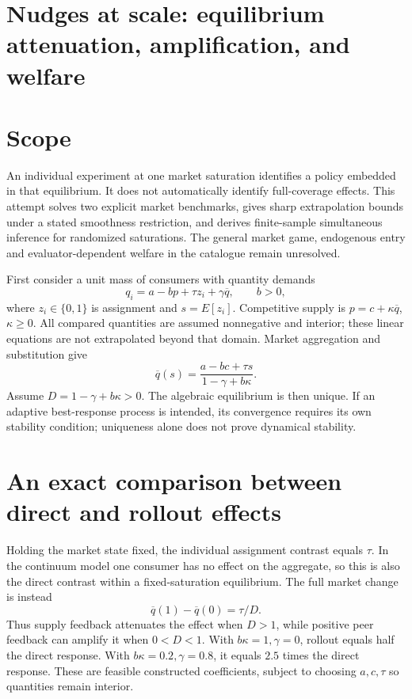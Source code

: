 \documentclass[11pt,a4paper]{article}
\begin{document}
\section*{Nudges at scale: equilibrium attenuation, amplification, and welfare}
\section{Scope}
An individual experiment at one market saturation identifies a policy embedded in that equilibrium. It does not automatically identify full-coverage effects. This attempt solves two explicit market benchmarks, gives sharp extrapolation bounds under a stated smoothness restriction, and derives finite-sample simultaneous inference for randomized saturations. The general market game, endogenous entry and evaluator-dependent welfare in the catalogue remain unresolved.

First consider a unit mass of consumers with quantity demands
\[
 q_i=a-bp+\tau z_i+\gamma\overline q,\qquad b>0,
\]
where $z_i\in\{0,1\}$ is assignment and $s=E[z_i]$. Competitive supply is $p=c+\kappa\overline q$, $\kappa\ge0$. All compared quantities are assumed nonnegative and interior; these linear equations are not extrapolated beyond that domain. Market aggregation and substitution give
\[
 \overline q(s)=\frac{a-bc+\tau s}{1-\gamma+b\kappa}. \tag{1}
\]
Assume $D=1-\gamma+b\kappa>0$. The algebraic equilibrium is then unique. If an adaptive best-response process is intended, its convergence requires its own stability condition; uniqueness alone does not prove dynamical stability.

\section{An exact comparison between direct and rollout effects}
Holding the market state fixed, the individual assignment contrast equals $\tau$. In the continuum model one consumer has no effect on the aggregate, so this is also the direct contrast within a fixed-saturation equilibrium. The full market change is instead
\[
 \overline q(1)-\overline q(0)=\tau/D. \tag{2}
\]
Thus supply feedback attenuates the effect when $D>1$, while positive peer feedback can amplify it when $0<D<1$. With $b\kappa=1,\gamma=0$, rollout equals half the direct response. With $b\kappa=0.2,\gamma=0.8$, it equals $2.5$ times the direct response. These are feasible constructed coefficients, subject to choosing $a,c,\tau$ so quantities remain interior.
\end{document}
